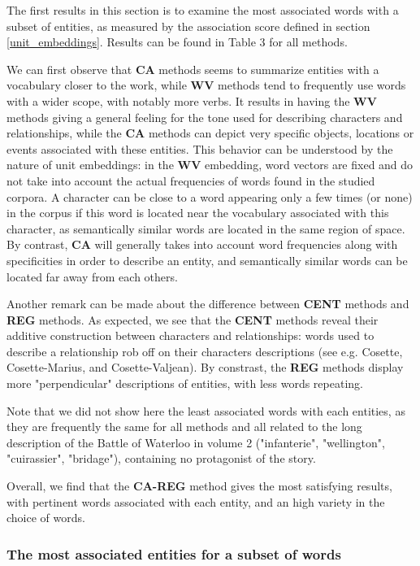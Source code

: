 \documentclass[
twocolumn,
]{ceurart}
\begin{document}
The first results in this section is to examine the most associated words with a subset of entities, as measured by the association score defined in section \ref{unit_embeddings}. Results can be found in Table 3 for all methods.

We can first observe that \textbf{CA} methods seems to summarize entities with a vocabulary closer to the work, while \textbf{WV} methods tend to frequently use words with a wider scope, with notably more verbs. It results in having the \textbf{WV} methods giving a general feeling for the tone used for describing characters and relationships, while the \textbf{CA} methods can depict very specific objects, locations or events associated with these entities. This behavior can be understood by the nature of unit embeddings: in the \textbf{WV} embedding, word vectors are fixed and do not take into account the actual frequencies of words found in the studied corpora. A character can be close to a word appearing only a few times (or none) in the corpus if this word is located near the vocabulary associated with this character, as semantically similar words are located in the same region of space. By contrast, \textbf{CA} will generally takes into account word frequencies along with specificities in order to describe an entity, and semantically similar words can be located far away from each others.

Another remark can be made about the difference between \textbf{CENT} methods and \textbf{REG} methods. As expected, we see that the \textbf{CENT} methods reveal their additive construction between characters and relationships: words used to describe a relationship rob off on their characters descriptions (see e.g. Cosette, Cosette-Marius, and Cosette-Valjean). By constrast, the \textbf{REG} methods display more "perpendicular" descriptions of entities, with less words repeating.   

Note that we did not show here the least associated words with each entities, as they are frequently the same for all methods and all related to the long description of the Battle of Waterloo in volume 2 ("infanterie", "wellington", "cuirassier", "bridage"), containing no protagonist of the story. 

Overall, we find that the \textbf{CA-REG} method gives the most satisfying results, with pertinent words associated with each entity, and an high variety in the choice of words. 
	
\subsubsection{The most associated entities for a subset of words}
\label{objects}
\end{document}
